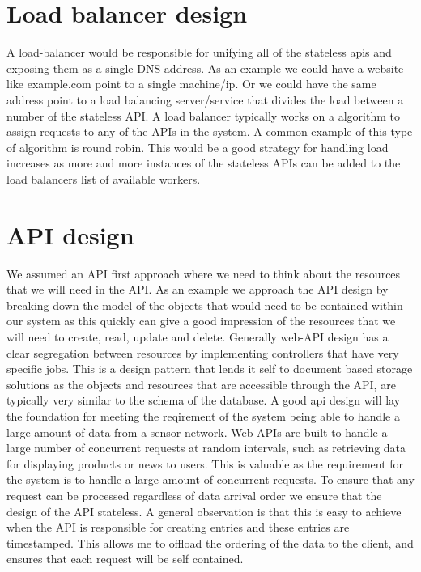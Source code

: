 \documentclass[]{uiophd}
\begin{document}
\section{Load balancer design}
A load-balancer would be responsible for unifying all of the stateless apis and exposing them as a single DNS address. As an example we could have a website like example.com point to a single machine/ip. Or we could have the same address point to a load balancing server/service that divides the load between a number of the stateless API. A load balancer typically works on a algorithm to assign requests to any of the APIs in the system. A common example of this type of algorithm is round robin. This would be a good strategy for handling load increases as more and more instances of the stateless APIs can be added to the load balancers list of available workers.

\section{API design}
We assumed an API first approach where we need to think about the resources that we will need in the API. As an example we approach the API design by breaking down the model of the objects that would need to be contained within our system as this quickly can give a good impression of the resources that we will need to create, read, update and delete. Generally web-API design has a clear segregation between resources by implementing controllers that have very specific jobs. This is a design pattern that lends it self to document based storage solutions as the objects and resources that are accessible through the API, are typically very similar to the schema of the database. A good api design will lay  the foundation for meeting the reqirement of the system being able to handle a large amount of data from a sensor network. Web APIs are built to handle a large number of concurrent requests at random intervals, such as retrieving data for displaying products or news to users. This is valuable as the requirement for the system is to handle a large amount of concurrent requests. To ensure that any request can be processed regardless of data arrival order we ensure that the design of the API stateless. A general observation is that this is easy to achieve when the API is responsible for creating entries and these entries are timestamped. This allows me to offload the ordering of the data to the client, and ensures that each request will be self contained.
\end{document}
